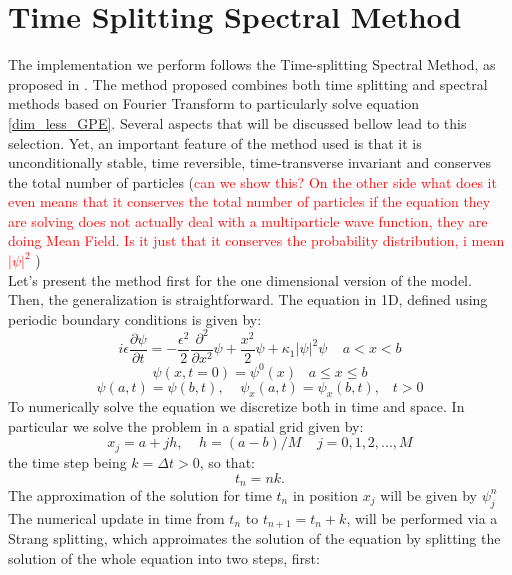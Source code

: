 \documentclass[a4paper,10pt]{article}
\begin{document}
\section{Time Splitting Spectral Method}
 The implementation we perform follows the Time-splitting Spectral Method, as proposed in \cite{Bao_Jack}. The method proposed combines both time splitting and spectral methods based on Fourier Transform to particularly solve equation \ref{dim_less_GPE}. Several aspects that will be discussed bellow lead to this selection. Yet, an important feature of the method used is that it is unconditionally stable, time reversible, time-transverse invariant and conserves the total number of particles (\textcolor{red}{can we show this? On the other side what does it even means that it conserves the total number of particles if the equation they are solving does not actually deal with a multiparticle wave function, they are doing Mean Field. Is it just that it conserves the probability distribution, i mean $|\psi|^2$ }) \\
 Let's present the method first for the one dimensional version of the model. Then, the generalization is straightforward. The equation in 1D, defined using periodic boundary conditions is given by:
 \begin{equation}
 i \epsilon \frac{\partial \psi}{\partial t}=-\frac{\epsilon^2}{2}\frac{\partial^2}{\partial x^2}\psi+\frac{x^2}{2}\psi+\kappa_1|\psi|^2\psi \;\;\;\; a< x< b  
 \end{equation}
\begin{equation}
 \psi(x,t=0)=\psi^{0}(x) \;\;\; a\leq x\leq b
\end{equation}
\begin{equation}
 \psi(a,t)=\psi(b,t), \;\;\;\; \psi_x(a,t)=\psi_x(b,t), \;\;\; t>0
\end{equation}
 To numerically solve the equation we discretize both in time and space. In particular we solve the problem in a spatial grid given by:
 \begin{equation}
  x_j=a+j h, \;\;\;\; h=(a-b)/M \;\;\;\; j=0,1,2,...,M
 \end{equation}
the time step being $k=\Delta t>0$, so that:
\begin{equation}
 t_n=n k.
\end{equation}
The approximation of the solution for time $t_n$ in position $x_j$ will be given by $\psi_j^n$
 The numerical update in time from $t_n$ to $t_{n+1}=t_n+k$, will be performed via a Strang splitting, which approimates the solution of the equation by splitting the solution of the whole equation into two steps, first:
\end{document}
